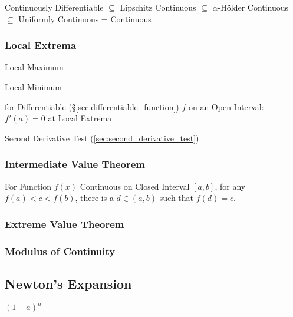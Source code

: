 Continuously Differentiable $\subseteq$ Lipschitz Continuous $\subseteq$
$\alpha$-H\"older Continuous $\subseteq$ Uniformly Continuous = Continuous



\subsubsection{Local Extrema}\label{sec:local_extrema}

Local Maximum

Local Minimum

for Differentiable (\S\ref{sec:differentiable_function}) $f$ on an
Open Interval: $f'(a) = 0$ at Local Extrema

\fist Second Derivative Test (\ref{sec:second_derivative_test})



\subsubsection{Intermediate Value Theorem}
\label{sec:intermediate_value}

For Function $f(x)$ Continuous on Closed Interval $[a,b]$, for any
$f(a) < c < f(b)$, there is a $d \in (a,b)$ such that $f(d) = c$.



\subsubsection{Extreme Value Theorem}\label{sec:extreme_value}

\subsubsection{Modulus of Continuity}\label{sec:continuity_modulus}



\subsection{Newton's Expansion}\label{sec:newtons_expansion}


$(1 + a)^n$ %



